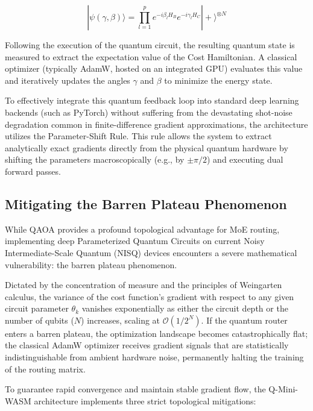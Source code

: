 \documentclass[11pt,a4paper]{article}
\begin{document}
$$|\psi(\gamma, \beta)\rangle = \prod_{l=1}^p e^{-i \beta_l H_B} e^{-i \gamma_l H_C} |+\rangle^{\otimes N}$$

Following the execution of the quantum circuit, the resulting quantum state is measured to extract the expectation value of the Cost Hamiltonian. A classical optimizer (typically AdamW, hosted on an integrated GPU) evaluates this value and iteratively updates the angles $\gamma$ and $\beta$ to minimize the energy state.

To effectively integrate this quantum feedback loop into standard deep learning backends (such as PyTorch) without suffering from the devastating shot-noise degradation common in finite-difference gradient approximations, the architecture utilizes the Parameter-Shift Rule. This rule allows the system to extract analytically exact gradients directly from the physical quantum hardware by shifting the parameters macroscopically (e.g., by $\pm \pi/2$) and executing dual forward passes.

\subsection{Mitigating the Barren Plateau Phenomenon}

While QAOA provides a profound topological advantage for MoE routing, implementing deep Parameterized Quantum Circuits on current Noisy Intermediate-Scale Quantum (NISQ) devices encounters a severe mathematical vulnerability: the barren plateau phenomenon.

Dictated by the concentration of measure and the principles of Weingarten calculus, the variance of the cost function's gradient with respect to any given circuit parameter $\theta_k$ vanishes exponentially as either the circuit depth or the number of qubits ($N$) increases, scaling at $\mathcal{O}(1/2^N)$. If the quantum router enters a barren plateau, the optimization landscape becomes catastrophically flat; the classical AdamW optimizer receives gradient signals that are statistically indistinguishable from ambient hardware noise, permanently halting the training of the routing matrix.

To guarantee rapid convergence and maintain stable gradient flow, the Q-Mini-WASM architecture implements three strict topological mitigations:
\end{document}
